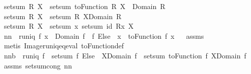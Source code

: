 \begin{isabellebody}
\isamarkupfalse%
\ {\isachardoublequoteopen}setsum{\isacharprime}{\isacharprime}\ R\ X\ {\isacharequal}{\isacharequal}\ setsum\ {\isacharparenleft}toFunction\ R{\isacharparenright}\ {\isacharparenleft}X\ {\isasyminter}\ Domain\ R{\isacharparenright}{\isachardoublequoteclose}\isanewline
{}\isamarkupfalse%
\ {\isachardoublequoteopen}setsum{\isacharprime}{\isacharprime}{\isacharprime}\ R\ X\ {\isacharequal}{\isacharequal}\ setsum{\isacharprime}\ R\ {\isacharparenleft}X{\isasyminter}Domain\ R{\isacharparenright}{\isachardoublequoteclose}\isanewline
{}\isamarkupfalse%
\ {\isachardoublequoteopen}setsum{\isacharprime}{\isacharprime}{\isacharprime}{\isacharprime}\ R\ X\ {\isacharequal}{\isacharequal}\ setsum\ {\isacharparenleft}{\isacharpercent}x{\isachardot}\ setsum\ id\ {\isacharparenleft}R{\isacharbackquote}{\isacharbackquote}{\isacharbraceleft}x{\isacharbraceright}{\isacharparenright}{\isacharparenright}\ X{\isachardoublequoteclose}\isanewline
\isanewline
{}\isamarkupfalse%
\ nn{}{}{\isacharcolon}\ \ {\isachardoublequoteopen}runiq\ f{\isachardoublequoteclose}\ {\isachardoublequoteopen}x\ {\isasymin}\ Domain\ f{\isachardoublequoteclose}\ \ {\isachardoublequoteopen}{\isacharparenleft}f\ Else\ {}{\isacharparenright}\ x\ {\isacharequal}\ {\isacharparenleft}toFunction\ f{\isacharparenright}\ x{\isachardoublequoteclose}%
\isadelimproof
\ %
\endisadelimproof
%
\isatagproof
{}\isamarkupfalse%
\ assms\ \isanewline
{}\isamarkupfalse%
\ {\isacharparenleft}metis\ Image{\isacharunderscore}runiq{\isacharunderscore}eq{\isacharunderscore}eval\ toFunction{\isacharunderscore}def{\isacharparenright}%
\endisatagproof
{\isafoldproof}%
%
\isadelimproof
%
\endisadelimproof
\isanewline
\isanewline
{}\isamarkupfalse%
\ nn{}{}b{\isacharcolon}\ \ {\isachardoublequoteopen}runiq\ f{\isachardoublequoteclose}\ \ {\isachardoublequoteopen}setsum\ {\isacharparenleft}f\ Else\ {}{\isacharparenright}\ {\isacharparenleft}X{\isasyminter}{\isacharparenleft}Domain\ f{\isacharparenright}{\isacharparenright}\ {\isacharequal}\ setsum\ {\isacharparenleft}toFunction\ f{\isacharparenright}\ {\isacharparenleft}X{\isasyminter}{\isacharparenleft}Domain\ f{\isacharparenright}{\isacharparenright}{\isachardoublequoteclose}\ \isanewline
%
\isadelimproof
%
\endisadelimproof
%
\isatagproof
{}\isamarkupfalse%
\ assms\ setsum{\isachardot}cong\ nn{}{}\ \isamarkupfalse%

\end{isabellebody}
